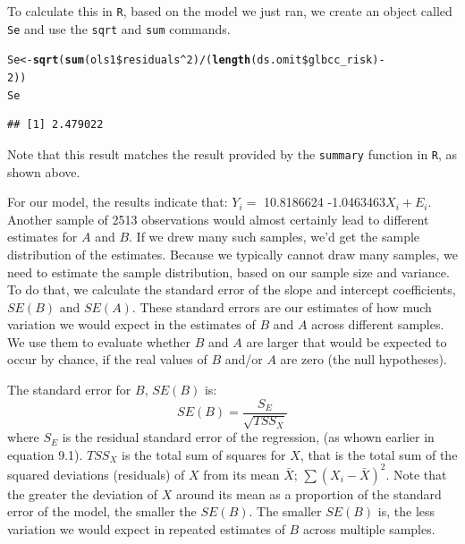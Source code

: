 \documentclass[11pt,openany]{book}\usepackage[]{graphicx}\usepackage[]{color}
\makeatletter
\newcommand{\hlnum}[1]{\textcolor[rgb]{0.686,0.059,0.569}{#1}}%
\newcommand{\hlopt}[1]{\textcolor[rgb]{0,0,0}{#1}}%
\newcommand{\hlstd}[1]{\textcolor[rgb]{0.345,0.345,0.345}{#1}}%
\newcommand{\hlkwb}[1]{\textcolor[rgb]{0.69,0.353,0.396}{#1}}%
\newcommand{\hlkwd}[1]{\textcolor[rgb]{0.737,0.353,0.396}{\textbf{#1}}}%
\newenvironment{kframe}{%
 \def\at@end@of@kframe{}%
 \ifinner\ifhmode%
  \def\at@end@of@kframe{\end{minipage}}%
  \begin{minipage}{\columnwidth}%
 \fi\fi%
 \def\FrameCommand##1{\hskip\@totalleftmargin \hskip-\fboxsep
 \colorbox{shadecolor}{##1}\hskip-\fboxsep
     \hskip-\linewidth \hskip-\@totalleftmargin \hskip\columnwidth}%
 \MakeFramed {\advance\hsize-\width
   \@totalleftmargin\z@ \linewidth\hsize
   \@setminipage}}%
 {\par\unskip\endMakeFramed%
 \at@end@of@kframe}
\newenvironment{knitrout}{}{} %
\renewenvironment{knitrout}{\begin{singlespace}}{\end{singlespace}}
\makeatother
\begin{document}
To calculate this in \texttt{R}, based on the model we just ran,  we create an object called \texttt{Se} and use the \texttt{sqrt} and \texttt{sum} commands. 
\begin{knitrout}
\color{fgcolor}\begin{kframe}
\begin{alltt}
\hlstd{Se} \hlkwb{<-} \hlkwd{sqrt}\hlstd{(}\hlkwd{sum}\hlstd{(ols1}\hlopt{\$}\hlstd{residuals}\hlopt{^}\hlnum{2}\hlstd{)}\hlopt{/}\hlstd{(}\hlkwd{length}\hlstd{(ds.omit}\hlopt{\$}\hlstd{glbcc_risk)} \hlopt{-}
    \hlnum{2}\hlstd{))}
\hlstd{Se}
\end{alltt}
\begin{verbatim}
## [1] 2.479022
\end{verbatim}
\end{kframe}
\end{knitrout}
\noindent Note that this result matches the result provided by the \texttt{summary} function in \texttt{R}, as shown above.  

For our model, the results indicate that: $Y_{i} =$ 10.8186624 -1.0463463$X_{i} + E_{i}$.  Another sample of 2513 observations would almost certainly lead to different estimates for $A$ and $B$.  If we drew many such samples, we’d get the sample distribution of the estimates. Because we typically cannot draw many samples, we need to estimate the sample distribution, based on our sample size and variance.  To do that, we calculate the standard error of the slope and intercept coefficients, $SE(B)$ and $SE(A)$. These standard errors are our estimates of how much variation we would expect in the estimates of $B$ and $A$ across different samples. We use them to evaluate whether $B$ and $A$ are larger that would be expected to occur by chance, if the real values of $B$ and/or $A$ are zero (the null hypotheses).

The standard error for $B$, $SE(B)$ is:
\begin{equation}
SE(B)=\frac{S_{E}}{\sqrt{TSS_{X}}}
\end{equation}
\noindent where $S_E$ is the residual standard error of the regression, (as whown earlier in equation 9.1). $TSS_X$ is the total sum of squares for $X$, that is the total sum of the squared deviations (residuals) of $X$ from its mean $\bar{X}$; $\sum (X_i-\bar{X})^{2}$. Note that the greater the deviation of $X$ around its mean as a proportion of the standard error of the model, the smaller the $SE(B)$. The smaller $SE(B)$ is, the less variation we would expect in repeated estimates of $B$ across multiple samples.
\end{document}
